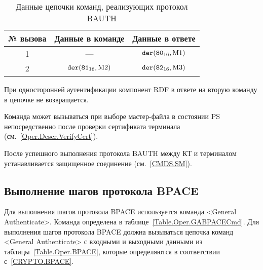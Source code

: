 \begin{table}[h]
\caption{Данные цепочки команд, реализующих протокол BAUTH}
\label{Table.Oper.BAUTH}
\begin{tabular}{|c|c|c|}
\hline
№ вызова & Данные в команде & Данные в ответе\\
\hline
\hline
1 & --- & $\texttt{der}(\texttt{80}_{16}, \text{M1})$\\
\hline
2 & $\texttt{der}(\texttt{81}_{16}, \text{M2})$ & 
$\texttt{der}(\texttt{82}_{16}, \text{M3})$  \\
\hline
\end{tabular}
\end{table}

При односторонней аутентификации компонент RDF в ответе на 
вторую команду в цепочке не возвращается.

Команда может вызываться при выборе мастер-файла в состоянии PS  
непосредственно после проверки сертификата терминала
(см.~\ref{Oper.Descr.VerifyCert}).

После успешного выполнения протокола BAUTH между КТ и терминалом 
устанавливается защищенное соединение (см.~\ref{CMDS.SM}).

\subsection{Выполнение шагов протокола BPACE}
\label{Oper.Descr.GABPACE} 

Для выполнения шагов протокола BPACE используется команда <General 
Authenticate>. 
Команда определена в таблице~\ref{Table.Oper.GABPACECmd}.
Для выполнения шагов протокола BPACE должна вызываться цепочка 
команд <General Authenticate> с входными и выходными данными 
из таблицы~\ref{Table.Oper.BPACE}, 
которые определяются в соответствии с~\ref{CRYPTO.BPACE}.

